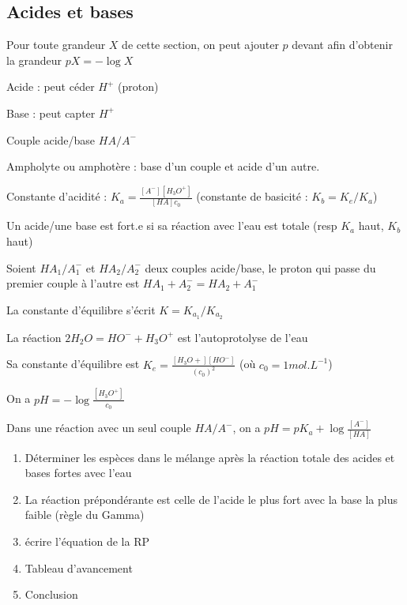 \documentclass[a4paper,12pt]{book}
\newcommand{\Def}[2]{\begin{tcolorbox}[colback=white,colframe=red!10!green!20!blue!75!, title=Définition : #1]#2\end{tcolorbox}}
\newcommand{\Thr}[2]{\begin{tcolorbox}[sharp corners, colback=white,colframe=red!10!blue!30!green!75!, title=Théorème : #1]#2\end{tcolorbox}}
\newcommand{\Meth}[2]{\begin{tcolorbox}[colback=white,colframe=green!60!green!30!black!75, title=Méthode :  #1]#2\end{tcolorbox}}
\begin{document}
\subsection{Acides et bases}
Pour toute grandeur $X$ de cette section, on peut ajouter $p$ devant afin d'obtenir la grandeur $pX =-\log X$
\Def{}{Acide : peut céder $H^+$ (proton)
\par Base : peut capter $H^+$
\par Couple acide/base $HA/A^-$
\par Ampholyte ou amphotère : base d'un couple et acide d'un autre.
\par Constante d'acidité : $K_a = \frac{[A^-][H_3O^+]}{[HA]c_0}$ (constante de basicité : $K_b = K_e/K_a$)
\par Un acide/une base est fort.e si sa réaction avec l'eau est totale (resp $K_a$ haut, $K_b$ haut)}
\Def{Réaction}{Soient $HA_1/ A_1^-$ et $HA_2/A_2^-$ deux couples acide/base, le proton qui passe du premier couple à l'autre est $HA_1+A_2^-=HA_2+A_1^-$
\par La constante d'équilibre s'écrit $K = K_{a_1}/K_{a_2}$
}
\Thr{Autoprotolyse}{La réaction $2H_2O=HO^-+H_3O^+$ est l'autoprotolyse de l'eau
\par Sa constante d'équilibre est $K_e=\frac{[H_3O+][HO^-]}{(c_0)^2}$ (où $c_0 = 1 mol.L^{-1}$)
\par On a $pH = -\log\frac{[H_3O^+]}{c_0}$
\par Dans une réaction avec un seul couple $HA/A^-$, on a $pH =pK_a + \log\frac{[A^-]}{[HA]}$ 
}
\Meth{Déterminer la réaction prépondérante}{\begin{enumerate}
\item Déterminer les espèces dans le mélange après la réaction totale des acides et bases fortes avec l'eau
\item La réaction prépondérante est celle de l'acide le plus fort avec la base la plus faible (règle du Gamma)
\item écrire l'équation de la RP
\item Tableau d'avancement
\item Conclusion
\end{enumerate}}
\end{document}

